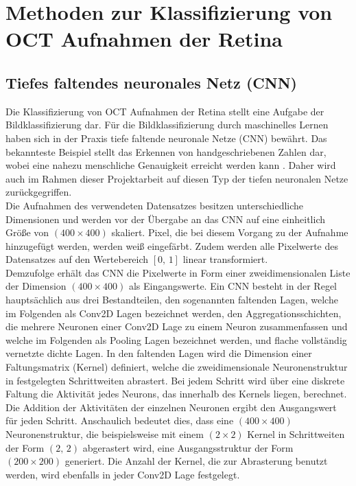 \section{Methoden zur Klassifizierung von OCT Aufnahmen der Retina}
\subsection{Tiefes faltendes neuronales Netz (CNN)}
Die Klassifizierung von OCT Aufnahmen der Retina stellt eine Aufgabe der Bildklassifizierung dar. Für die Bildklassifizierung durch maschinelles Lernen haben sich in der Praxis tiefe faltende neuronale Netze (CNN) bewährt. Das bekannteste Beispiel stellt das Erkennen von handgeschriebenen Zahlen dar, wobei eine nahezu menschliche Genauigkeit erreicht werden kann \cite{MNIST}. Daher wird auch im Rahmen dieser Projektarbeit auf diesen Typ der tiefen neuronalen Netze zurückgegriffen. \\
Die Aufnahmen des verwendeten Datensatzes besitzen unterschiedliche Dimensionen und werden vor der Übergabe an das CNN auf eine einheitlich Größe von $(400\times 400)$ skaliert. Pixel, die bei diesem Vorgang zu der Aufnahme hinzugefügt werden, werden weiß eingefärbt. Zudem werden alle Pixelwerte des Datensatzes auf den Wertebereich $[0,\,1]$ linear transformiert. \\ 
Demzufolge erhält das CNN die Pixelwerte in Form einer zweidimensionalen Liste der Dimension $(400\times 400)$ als Eingangswerte. Ein CNN besteht in der Regel hauptsächlich aus drei Bestandteilen, den sogenannten faltenden Lagen, welche im Folgenden als Conv2D Lagen bezeichnet werden, den Aggregationsschichten, die mehrere Neuronen einer Conv2D Lage zu einem Neuron zusammenfassen und welche im Folgenden als Pooling Lagen bezeichnet werden, und flache vollständig vernetzte dichte Lagen. In den faltenden Lagen wird die Dimension einer Faltungsmatrix (Kernel) definiert, welche die zweidimensionale Neuronenstruktur in festgelegten Schrittweiten abrastert. Bei jedem Schritt wird über eine diskrete Faltung die Aktivität jedes Neurons, das innerhalb des Kernels liegen, berechnet. Die Addition der Aktivitäten der einzelnen Neuronen ergibt den Ausgangswert für jeden Schritt. Anschaulich bedeutet dies, dass eine $(400\times 400)$ Neuronenstruktur, die beispielsweise mit einem $(2 \times 2)$ Kernel in Schrittweiten der Form $(2,\,2)$ abgerastert wird, eine Ausgangsstruktur der Form $(200\times 200)$ generiert. Die Anzahl der Kernel, die zur Abrasterung benutzt werden, wird ebenfalls in jeder Conv2D Lage festgelegt.  \\
